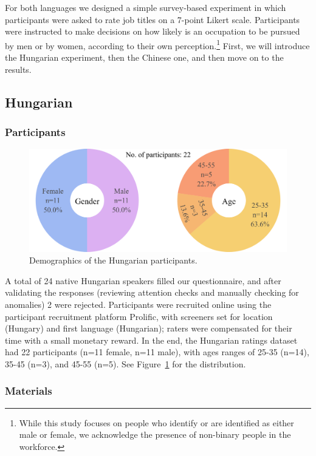 \documentclass[11pt]{article}
\begin{document}
For both languages we designed a simple survey-based experiment in which participants were asked to rate job titles on a 7-point Likert scale.
Participants were instructed to make decisions on how likely is an occupation to be pursued by men or by women, according to their own perception.\footnote{While this study focuses on people who identify or are identified as either male or female, we acknowledge the presence of non-binary people in the workforce.} First, we will introduce the Hungarian experiment, then the Chinese one, and then move on to the results.

\subsection{Hungarian}

\subsubsection{Participants}

\begin{figure}[!ht]
  \centering
  \includegraphics[width=\linewidth]{../demographics_hu}
  \caption{Demographics of the Hungarian participants.}
  \label{fig:demographics_hu}
\end{figure}

A total of 24 native Hungarian speakers filled our questionnaire, and after validating the responses (reviewing attention checks and manually checking for anomalies) 2 were rejected. Participants were recruited online using the participant recruitment platform Prolific, with screeners set for location (Hungary) and first language (Hungarian); raters were compensated for their time with a small monetary reward. In the end, the Hungarian ratings dataset had 22 participants (n=11 female, n=11 male), with ages ranges of 25-35 (n=14), 35-45 (n=3), and 45-55 (n=5). See Figure~\ref{fig:demographics_hu} for the distribution.

\subsubsection{Materials}
\end{document}
